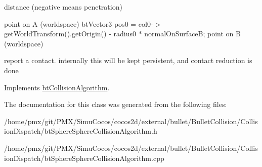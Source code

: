 distance (negative means penetration)

point on A (worldspace) bt\+Vector3 pos0 = col0-\/$>$get\+World\+Transform().get\+Origin() -\/ radius0 $\ast$ normal\+On\+SurfaceB; point on B (worldspace)

report a contact. internally this will be kept persistent, and contact reduction is done 

Implements \hyperlink{classbtCollisionAlgorithm}{bt\+Collision\+Algorithm}.



The documentation for this class was generated from the following files\+:\begin{DoxyCompactItemize}
\item 
/home/pmx/git/\+P\+M\+X/\+Simu\+Cocos/cocos2d/external/bullet/\+Bullet\+Collision/\+Collision\+Dispatch/bt\+Sphere\+Sphere\+Collision\+Algorithm.\+h\item 
/home/pmx/git/\+P\+M\+X/\+Simu\+Cocos/cocos2d/external/bullet/\+Bullet\+Collision/\+Collision\+Dispatch/bt\+Sphere\+Sphere\+Collision\+Algorithm.\+cpp\end{DoxyCompactItemize}
